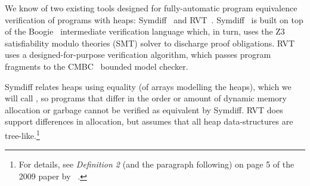 \documentclass[runningheads,a4paper]{llncs}
\begin{document}
We know of two existing tools designed for fully-automatic program equivalence verification of programs with heaps: Symdiff~\cite{Lahiri2012} and RVT~\cite{Godlin09}. Symdiff~\cite{Kawaguchi2010,Lahiri2012,Lahiri2013,Hawblitzel2013} is built on top of the Boogie~\cite{Barnett2005} intermediate verification language which, in turn, uses the Z3~\cite{DeMoura2008} satisfiability modulo theories (SMT) solver to discharge proof obligations. RVT uses a designed-for-purpose verification algorithm, which passes program fragments to the CMBC~\cite{Clarke2003} bounded model checker. 

Symdiff relates heaps using equality (of arrays modelling the heaps), which we will call \emph{\symdiffequivn{}}, so programs that differ in the order or amount of dynamic memory allocation or garbage cannot be verified as equivalent by Symdiff. RVT does support differences in allocation, but assumes that all heap data-structures are tree-like.\footnote{For details, see \emph{Definition 2} (and the paragraph following) on page 5 of the 2009 paper by \citeauthor{Godlin09}~\cite{Godlin09}.}
\end{document}
